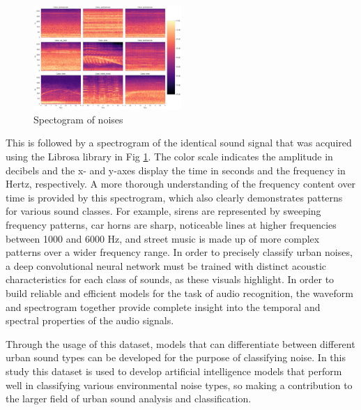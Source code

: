 \documentclass[conference]{IEEEtran}
\begin{document}
\begin{figure}[htbp]
\centerline{\includegraphics[width=0.5\textwidth]{Images/spectogram.png}}
\caption{Spectogram of noises }
\label{fig:spectogram}
\end{figure}


This is followed by a spectrogram of the identical sound signal that was acquired using the Librosa library in Fig \ref{fig:spectogram}. The color scale indicates the amplitude in decibels and the x- and y-axes display the time in seconds and the frequency in Hertz, respectively. A more thorough understanding of the frequency content over time is provided by this spectrogram, which also clearly demonstrates patterns for various sound classes. For example, sirens are represented by sweeping frequency patterns, car horns are sharp, noticeable lines at higher frequencies between 1000 and 6000 Hz, and street music is made up of more complex patterns over a wider frequency range. In order to precisely classify urban noises, a deep convolutional neural network must be trained with distinct acoustic characteristics for each class of sounds, as these visuals highlight. In order to build reliable and efficient models for the task of audio recognition, the waveform and spectrogram together provide complete insight into the temporal and spectral properties of the audio signals.



Through the usage of this dataset, models that can differentiate between different urban sound types can be developed for the purpose of classifying noise. In this study  this dataset is used  to develop artificial intelligence models that perform well in classifying various environmental noise types, so making a contribution to the larger field of urban sound analysis and classification.
\end{document}

